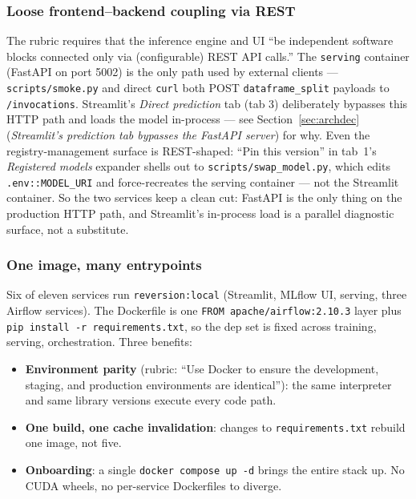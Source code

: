 \documentclass[11pt,a4paper]{article}
\begin{document}
\subsubsection{Loose frontend--backend coupling via REST}
The rubric requires that the inference engine and UI ``be independent software blocks connected only via (configurable) REST API calls.'' The \texttt{serving} container (FastAPI on port 5002) is the only path used by external clients --- \texttt{scripts/smoke.py} and direct \texttt{curl} both POST \texttt{dataframe\_split} payloads to \texttt{/invocations}. Streamlit's \emph{Direct prediction} tab (tab 3) deliberately bypasses this HTTP path and loads the model in-process --- see Section~\ref{sec:archdec} (\emph{Streamlit's prediction tab bypasses the FastAPI server}) for why. Even the registry-management surface is REST-shaped: ``Pin this version'' in tab~1's \emph{Registered models} expander shells out to \texttt{scripts/swap\_model.py}, which edits \texttt{.env::MODEL\_URI} and force-recreates the serving container --- not the Streamlit container. So the two services keep a clean cut: FastAPI is the only thing on the production HTTP path, and Streamlit's in-process load is a parallel diagnostic surface, not a substitute.

\subsubsection{One image, many entrypoints}
Six of eleven services run \texttt{reversion:local} (Streamlit, MLflow UI, serving, three Airflow services). The Dockerfile is one \texttt{FROM apache/airflow:2.10.3} layer plus \texttt{pip install -r requirements.txt}, so the dep set is fixed across training, serving, orchestration. Three benefits:

\begin{itemize}[leftmargin=1.5em,itemsep=0pt]
  \item \textbf{Environment parity} (rubric: ``Use Docker to ensure the development, staging, and production environments are identical''): the same interpreter and same library versions execute every code path.
  \item \textbf{One build, one cache invalidation}: changes to \texttt{requirements.txt} rebuild one image, not five.
  \item \textbf{Onboarding}: a single \texttt{docker compose up -d} brings the entire stack up. No CUDA wheels, no per-service Dockerfiles to diverge.
\end{itemize}
\end{document}
